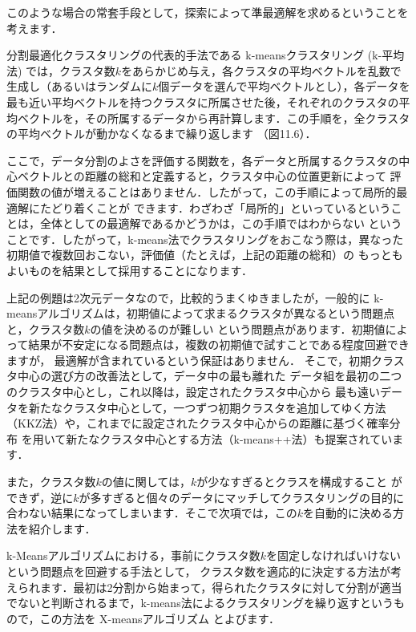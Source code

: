 このような場合の常套手段として，探索によって準最適解を求めるということを考えます．


分割最適化クラスタリングの代表的手法である
k-meansクラスタリング (k-平均法)
では，クラスタ数$k$をあらかじめ与え，各クラスタの平均ベクトルを乱数で生成し（あるいはランダムに$k$個データを選んで平均ベクトルとし），各データを
最も近い平均ベクトルを持つクラスタに所属させた後，それぞれのクラスタの平均ベクトルを，その所属するデータから再計算します．この手順を，全クラスタの平均ベクトルが動かなくなるまで繰り返します
（図11.6）．


ここで，データ分割のよさを評価する関数を，各データと所属するクラスタの中心ベクトルとの距離の総和と定義すると，クラスタ中心の位置更新によって
評価関数の値が増えることはありません．したがって，この手順によって局所的最適解にたどり着くことが
できます．わざわざ「局所的」といっているということは，全体としての最適解であるかどうかは，この手順ではわからない
ということです．したがって，k-means法でクラスタリングをおこなう際は，異なった初期値で複数回おこない，評価値（たとえば，上記の距離の総和）の
もっともよいものを結果として採用することになります．


上記の例題は2次元データなので，比較的うまくゆきましたが，一般的に
k-meansアルゴリズムは，初期値によって求まるクラスタが異なるという問題点と，クラスタ数$k$の値を決めるのが難しい
という問題点があります．初期値によって結果が不安定になる問題点は，複数の初期値で試すことである程度回避できますが，
最適解が含まれているという保証はありません．
そこで，初期クラスタ中心の選び方の改善法として，データ中の最も離れた
データ組を最初の二つのクラスタ中心とし，これ以降は，設定されたクラスタ中心から
最も遠いデータを新たなクラスタ中心として，一つずつ初期クラスタを追加してゆく方法
（KKZ法）や，これまでに設定されたクラスタ中心からの距離に基づく確率分布
を用いて新たなクラスタ中心とする方法（k-means++法）も提案されています．

また，クラスタ数$k$の値に関しては，$k$が少なすぎるとクラスを構成すること
ができず，逆に$k$が多すぎると個々のデータにマッチしてクラスタリングの目的に合わない結果になってしまいます．そこで次項では，この$k$を自動的に決める方法を紹介します．


k-Meansアルゴリズムにおける，事前にクラスタ数$k$を固定しなければいけないという問題点を回避する手法として，
クラスタ数を適応的に決定する方法が考えられます．最初は2分割から始まって，得られたクラスタに対して分割が適当
でないと判断されるまで，k-means法によるクラスタリングを繰り返すというもので，この方法を
X-meansアルゴリズム
とよびます．

